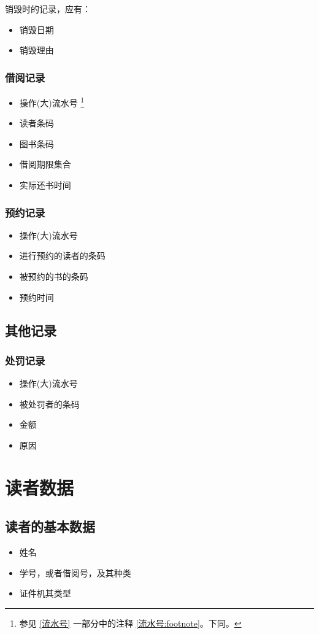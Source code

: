 \documentclass[UTF8]{report}
\begin{document}
    销毁时的记录，应有：
    \begin{itemize}
        \item 销毁日期
        \item 销毁理由
    \end{itemize}
    \subsection{借阅记录}
    \begin{itemize}
        \item 操作(大)流水号 \footnote{\label{参见}
            参见  \ref{流水号} 一部分中的注释 \ref{流水号:footnote}。下同。}
        \item 读者条码
        \item 图书条码
        \item 借阅期限集合
        \item 实际还书时间
    \end{itemize}
    \subsection{预约记录}
    \begin{itemize}
        \item 操作(大)流水号
        \item 进行预约的读者的条码
        \item 被预约的书的条码
        \item 预约时间
    \end{itemize}
    \section{其他记录}
    \subsection{处罚记录}
    \begin{itemize}
        \item 操作(大)流水号
        \item 被处罚者的条码
        \item 金额
        \item 原因
    \end{itemize}
    \chapter{读者数据}
    \section{读者的基本数据}
    \begin{itemize}
    	\item 姓名
    	\item 学号，或者借阅号，及其种类
    	\item 证件机其类型
    \end{itemize}
\end{document}
